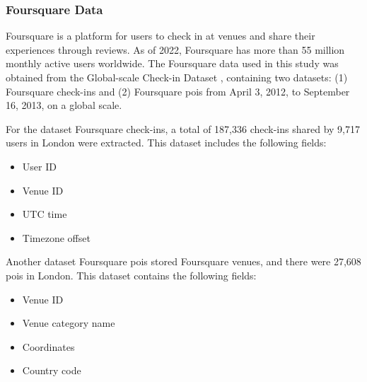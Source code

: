 \documentclass{article}
\theoremstyle{remark}
\begin{document}
\subsubsection{Foursquare Data}
Foursquare is a platform for users to check in at venues and share their experiences through reviews. As of 2022, Foursquare has more than 55 million monthly active users worldwide. The Foursquare data used in this study was obtained from the Global-scale Check-in Dataset \cite{yang_nationtelescope_2015}, containing two datasets: (1) Foursquare check-ins and (2) Foursquare \acrshort{poi}s from April 3, 2012, to September 16, 2013, on a global scale.

For the dataset Foursquare check-ins, a total of 187,336 check-ins shared by 9,717 users in London were extracted. This dataset includes the following fields:
\begin{itemize}
    \item User ID
    \item Venue ID
    \item UTC time
    \item Timezone offset
\end{itemize}

Another dataset Foursquare \acrshort{poi}s stored Foursquare venues, and there were 27,608 \acrshort{poi}s in London. This dataset contains the following fields:
\begin{itemize}
    \item Venue ID
    \item Venue category name
    \item Coordinates
    \item Country code
\end{itemize}
\end{document}
